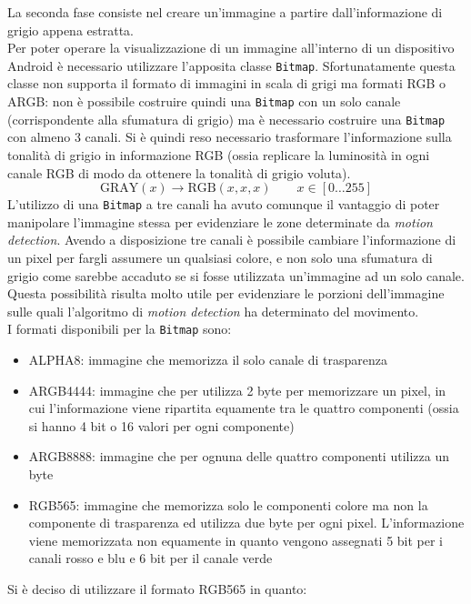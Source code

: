 La seconda fase consiste nel creare un'immagine a partire dall'informazione di grigio appena estratta.\\
Per poter operare la visualizzazione di un immagine all'interno di un dispositivo Android è necessario utilizzare l'apposita classe \texttt{Bitmap}. Sfortunatamente questa classe non supporta il formato di immagini in scala di grigi ma formati RGB o ARGB: non è possibile costruire quindi una \texttt{Bitmap} con un solo canale (corrispondente alla sfumatura di grigio) ma è necessario costruire una \texttt{Bitmap} con almeno 3 canali. Si è quindi reso necessario trasformare l'informazione sulla tonalità di grigio in informazione RGB (ossia replicare la luminosità in ogni canale RGB di modo da ottenere la tonalità di grigio voluta).
\[\text{GRAY}(x) \to \text{RGB}(x, x, x) \qquad x \in [0 \ldots 255] \]
L'utilizzo di una \texttt{Bitmap} a tre canali ha avuto comunque il vantaggio di poter manipolare l'immagine stessa per evidenziare le zone determinate da \textit{motion detection}. Avendo a disposizione tre canali è possibile cambiare l'informazione di un pixel per fargli assumere un qualsiasi colore, e non solo una sfumatura di grigio come sarebbe accaduto se si fosse utilizzata un'immagine ad un solo canale. Questa possibilità risulta molto utile per evidenziare le porzioni dell'immagine sulle quali l'algoritmo di \textit{motion detection} ha determinato del movimento.\\
I formati disponibili per la \texttt{Bitmap} sono:
\begin{itemize}
  \item ALPHA8: immagine che memorizza il solo canale di trasparenza
  \item ARGB4444: immagine che per utilizza 2 byte per memorizzare un pixel, in cui l'informazione viene ripartita equamente tra le quattro componenti (ossia si hanno 4 bit o 16 valori per ogni componente)
  \item ARGB8888: immagine che per ognuna delle quattro componenti utilizza un byte
  \item RGB565: immagine che memorizza solo le componenti colore ma non la componente di trasparenza ed utilizza due byte per ogni pixel. L'informazione viene memorizzata non equamente in quanto vengono assegnati 5 bit per i canali rosso e blu e 6 bit per il canale verde
\end{itemize}
Si è deciso di utilizzare il formato RGB565 in quanto:
